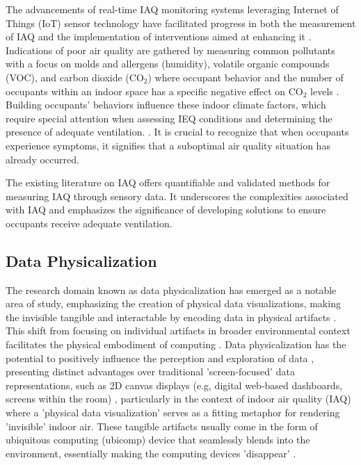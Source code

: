 The advancements of real-time IAQ monitoring systems leveraging Internet of Things (IoT) sensor technology have facilitated progress in both the measurement of IAQ and the implementation of interventions aimed at enhancing it \cite{pantelic_transformational_2022}. Indications of poor air quality are gathered by measuring common pollutants with a focus on molds and allergens (humidity), volatile organic compounds (VOC), and carbon dioxide (CO$_{2}$) \cite{klepeis_national_2001} where occupant behavior and the number of occupants within an indoor space has a specific negative effect on CO$_{2}$ levels \cite{fromme_indoor_2023}. Building occupants' behaviors influence these indoor climate factors, which require special attention when assessing IEQ conditions and determining the presence of adequate ventilation. \cite{du_indoor_2020}. It is crucial to recognize that when occupants experience symptoms, it signifies that a suboptimal air quality situation has already occurred.

The existing literature on IAQ offers quantifiable and validated methods for measuring IAQ through sensory data. It underscores the complexities associated with IAQ and emphasizes the significance of developing solutions to ensure occupants receive adequate ventilation.


\subsection{Data Physicalization}
\label{sec:phys}

The research domain known as data physicalization \cite{alexander_data_2019, jansen_opportunities_2015} has emerged as a notable area of study, emphasizing the creation of physical data visualizations, making the invisible tangible and interactable by encoding data in physical artifacts \cite{ranasinghe_encoding_2023}. This shift from focusing on individual artifacts in broader environmental context facilitates the physical embodiment of computing \cite{dragicevic_data_2020}. Data physicalization has the potential to positively influence the perception and exploration of data \cite{jansen_opportunities_2015, wang_emotional_2019, stusak_evaluating_2015}, presenting distinct advantages over traditional 'screen-focused' data representations, such as 2D canvas displays (e.g, digital web-based dashboards, screens within the room) \cite{hornecker_design_2023, jansen_evaluating_2013}, particularly in the context of indoor air quality (IAQ) where a 'physical data visualization' serves as a fitting metaphor for rendering 'invisible' indoor air. These tangible artifacts usually come in the form of ubiquitous computing (ubicomp) \cite{bell_yesterdays_2007} device that seamlessly blends into the environment, essentially making the computing devices 'disappear' \cite{weiser_computer_1999}. 

